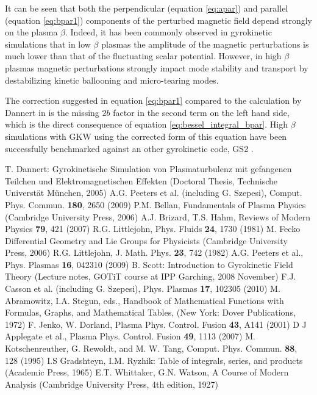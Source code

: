 \documentclass[a4paper,10pt]{article}
\begin{document}
It can be seen that both the perpendicular (equation \ref{eq:apar}) and parallel (equation \ref{eq:bpar1}) components of the perturbed magnetic field depend strongly on the plasma $\beta$. Indeed, it has been commonly observed in gyrokinetic simulations that in low $\beta$ plasmas the amplitude of the magnetic perturbations is much lower than that of the fluctuating scalar potential. However, in high $\beta$ plasmas magnetic perturbations strongly impact mode stability and transport by destabilizing kinetic ballooning \cite{jenko_em} and micro-tearing \cite{applegate_mtm} modes.

The correction suggested in equation \ref{eq:bpar1} compared to the calculation by Dannert in \cite{dannert} is the missing $2 b$ factor in the second term on the left hand side, which is the direct consequence of equation \ref{eq:bessel_integral_bpar}. High $\beta$ simulations with GKW using the corrected form of this equation have been successfully benchmarked against an other gyrokinetic code, GS2 \cite{gs2}.



\newpage

\begin{thebibliography}{99}
  T. Dannert: Gyrokinetische Simulation von Plasmaturbulenz mit gefangenen Teilchen und Elektromagnetischen Effekten (Doctoral Thesis, Technische Universt\"at M\"unchen, 2005)
  A.G. Peeters et al. (including G. Szepesi), Comput. Phys. Commun. {\bf 180}, 2650 (2009)
  P.M. Bellan, Fundamentals of Plasma Physics (Cambridge University Press, 2006)
  A.J. Brizard, T.S. Hahm, Reviews of Modern Physics {\bf 79}, 421 (2007)
  R.G. Littlejohn, Phys. Fluids {\bf 24}, 1730 (1981)
  M. Fecko Differential Geometry and Lie Groups for Physicists (Cambridge University Press, 2006) 
  R.G. Littlejohn, J. Math. Phys. {\bf 23}, 742 (1982)
  A.G. Peeters et al., Phys. Plasmas {\bf 16}, 042310 (2009)
  B. Scott: Introduction to Gyrokinetic Field Theory (Lecture notes, GOTiT course at IPP Garching, 2008 November)
  F.J. Casson et al. (including G. Szepesi), Phys. Plasmas {\bf 17}, 102305 (2010)
  M. Abramowitz, I.A. Stegun, eds., Handbook of Mathematical Functions with Formulas, Graphs, and Mathematical Tables, (New York: Dover Publications, 1972)
  F. Jenko, W. Dorland, Plasma Phys. Control. Fusion {\bf 43}, A141 (2001)
  D J Applegate et al., Plasma Phys. Control. Fusion {\bf 49}, 1113 (2007)
  M. Kotschenreuther, G. Rewoldt, and M. W. Tang, Comput. Phys. Commun. {\bf 88}, 128 (1995)
 I.S Gradshteyn, I.M. Ryzhik: Table of integrals, series, and products (Academic Press, 1965)
  E.T. Whittaker, G.N. Watson, A Course of Modern Analysis (Cambridge University Press, 4th edition, 1927)
\end{thebibliography}
\end{document}
